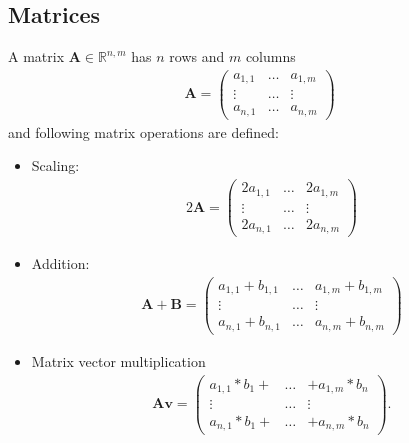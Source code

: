 \subsection{Matrices}
A matrix $\mathbf{A}\in \mathbb{R}^{n,m}$ has $n$ rows and $m$ columns
\begin{align}
\mathbf{A} = \begin{pmatrix}
a_{1,1} & \ldots & a_{1,m} \\
\vdots & \ldots & \vdots \\
a_{n,1} & \ldots & a_{n,m} 
\end{pmatrix}
\end{align} 
and following matrix operations are defined:
\begin{itemize}
\item Scaling:
\begin{align}
 2 \mathbf{A} = \begin{pmatrix}
2a_{1,1} & \ldots & 2a_{1,m} \\
\vdots & \ldots & \vdots \\
2a_{n,1} & \ldots & 2a_{n,m} 
\end{pmatrix} 
\end{align}
\item Addition:
\begin{align}
\mathbf{A} + \mathbf{B}  = \begin{pmatrix}
a_{1,1} + b_{1,1}  & \ldots & a_{1,m} + b_{1,m} \\
\vdots & \ldots & \vdots \\
a_{n,1} + b_{n,1} & \ldots & a_{n,m} + b_{n,m} 
\end{pmatrix}
\end{align}
\item Matrix vector multiplication
\begin{align}
\mathbf{A}  \mathbf{v}  = \begin{pmatrix}
a_{1,1} * b_{1} + & \ldots & + a_{1,m} * b_{n} \\
\vdots & \ldots & \vdots \\
a_{n,1} * b_{1} + & \ldots & + a_{n,m} * b_{n} 
\end{pmatrix}\text{.}
\end{align}
\end{itemize}
